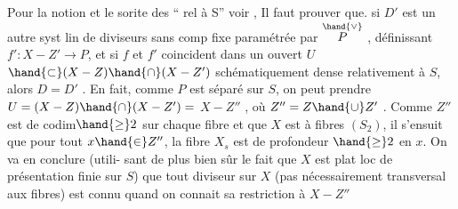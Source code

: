 Pour la notion et le sorite des ``
rel à S'' voir  ,  Il faut prouver que.
si  $D'$ est un
autre syst lin de diviseurs sans comp fixe paramétrée par $\overset{\hand{\vee}}{P}$ , 
définissant $f': X-Z' \longrightarrow P$, et si $f$ et $f'$ coincident dans un ouvert $U$
$\hand{\subset} (X-Z)\hand{\cap}(X-Z')$ schématiquement dense relativement à $S$, alors $D=D'$ .
En fait, comme $P$ est séparé sur $S$, on peut prendre $U=(X-Z)\hand{\cap}(X-Z') =$
 $X-Z''$ , où $Z'' = Z\hand{\cup}Z'$ . Comme $Z''$ est de codim$\hand{\geq}2$
sur chaque fibre et que $X$ est à fibres $(S_2)$, il s'ensuit que pour tout
$x\hand{\in} Z''$, la fibre $X_s$ est de profondeur $\hand{\geq}2$ en $x$. On va en conclure (utili-%
sant de plus bien sûr le fait que $X$ est plat loc de présentation finie
sur $S$) que tout diviseur  sur $X$ (pas nécessairement 
transversal aux fibres) est connu quand on connait sa restriction à $X-Z''$

